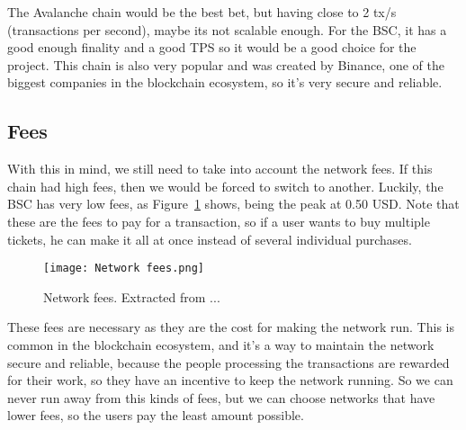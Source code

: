 The Avalanche chain would be the best bet, but having close to 2 tx/s
(transactions per second), maybe its not scalable enough. For the BSC, it has a
good enough finality and a good TPS so it would be a good choice for the
project. This chain is also very popular and was created by Binance, one of the
biggest companies in the blockchain ecosystem, so it's very secure and
reliable.

\subsection{Fees}
\label{subsec:fees}

With this in mind, we still need to take into account the network fees. If this
chain had high fees, then we would be forced to switch to another. Luckily, the
BSC has very low fees, as Figure~\ref{fig:network_fees} shows, being the peak
at 0.50 USD. Note that these are the fees to pay for a transaction, so if a
user wants to buy multiple tickets, he can make it all at once instead of
several individual purchases.

\begin{figure}[H]
    \texttt{[image: Network fees.png]}
    \centering
    \caption{Network fees. Extracted from ...}
    \label{fig:network_fees}
\end{figure}

These fees are necessary as they are the cost for making the network run. This
is common in the blockchain ecosystem, and it's a way to maintain the network
secure and reliable, because the people processing the transactions are
rewarded for their work, so they have an incentive to keep the network running.
So we can never run away from this kinds of fees, but we can choose networks
that have lower fees, so the users pay the least amount possible.
